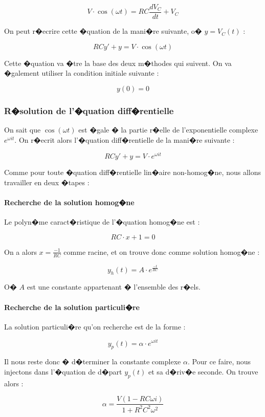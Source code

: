 \documentclass{article}
\begin{document}
$$V \cdot \cos (\omega t) = RC\frac{dV_C}{dt}  + V_C$$

On peut r�ecrire cette �quation de la mani�re suivante, o� $y = V_C(t)$ :

$$RCy' + y = V \cdot \cos (\omega t)$$

Cette �quation va �tre la base des deux m�thodes qui suivent. On va �galement utiliser 
la condition initiale suivante :

$$y(0) = 0$$

\subsubsection{R�solution de l'�quation diff�rentielle}

On sait que $\cos (\omega t)$ est �gale � la partie r�elle de l'exponentielle
complexe $e^{\omega i t}$. On r�ecrit alors l'�quation diff�rentielle de la
mani�re suivante :

$$RCy' + y = V \cdot e^{\omega i t}$$

Comme pour toute �quation diff�rentielle lin�aire non-homog�ne, nous allons travailler
en deux �tapes :

\paragraph{Recherche de la solution homog�ne}

Le polyn�me caract�ristique de l'�quation homog�ne est :

$$RC \cdot x + 1 = 0$$

On a alors $x = \frac{-1}{RC}$ comme racine, et on trouve donc comme solution homog�ne :

$$y_h(t) = A \cdot e^{\frac{-t}{RC}}$$

O� $A$ est une constante appartenant � l'ensemble des r�els. %

\paragraph{Recherche de la solution particuli�re}

La solution particuli�re qu'on recherche est de la forme :

$$y_p(t) = \alpha \cdot e^{\omega i t}$$

Il nous reste donc � d�terminer la constante complexe $\alpha$. Pour ce faire,
nous injectons dans l'�quation de d�part $y_p(t)$ et sa d�riv�e seconde. On
trouve alors :

$$\alpha = \frac{V(1-RC\omega i)}{1+R^2C^2\omega^2}$$
\end{document}
